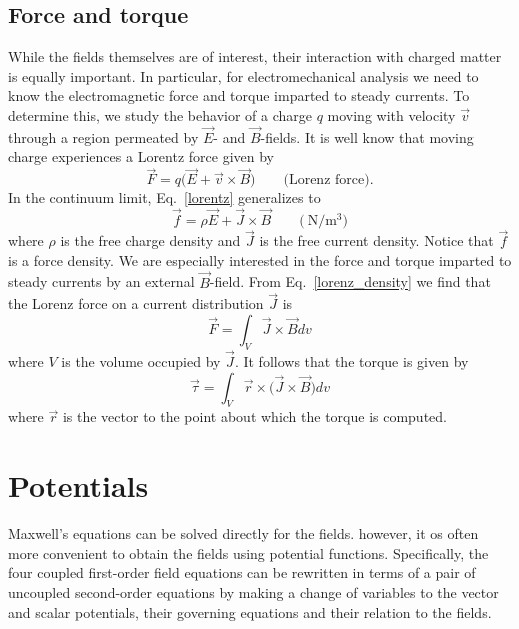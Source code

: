 \documentclass[12pt,a4paper,oneside]{book}
\begin{document}
\begin{onehalfspace}
\subsection{Force and torque}
While the fields themselves are of interest, their interaction with charged matter is equally important. In particular, for electromechanical analysis we need to know the electromagnetic force and torque imparted to steady currents. To determine this, we study the behavior of a charge $q$ moving with velocity $\vec{v}$ through a region permeated by $\vec{E}$- and $\vec{B}$-fields. It is well know that moving charge experiences a Lorentz force given by 
\begin{equation}\label{lorenz}
	\vec{F} = q\big(\vec{E}+\vec{v}\times\vec{B}\big) \qquad\text{(Lorenz force).}
\end{equation}
In the continuum limit, Eq.~\eqref{lorentz} generalizes to 
\begin{equation}\label{lorenz_density}
	\vec{f} = \rho\vec{E}+\vec{J}\times\vec{B} \qquad\big(\SI{}{\newton\per\cubic\meter}\big)
\end{equation}
where $\rho$ is the free charge density and $\vec{J}$ is the free current density. Notice that $\vec{f}$ is a force density.
We are especially interested in the force and torque imparted to steady currents by an external $\vec{B}$-field. From Eq.~\eqref{lorenz_density} we find that the Lorenz force on a current distribution $\vec{J}$ is
\begin{equation}\label{lorenz_volume}
	\vec{F} = \int_{V}\vec{J}\times\vec{B}dv
\end{equation}
where $V$ is the volume occupied by $\vec{J}$. It follows that the torque is given by
\begin{equation}\label{torque_volume}
	\vec{\tau} = \int_{V}\vec{r}\times\big(\vec{J}\times\vec{B}\big)dv
\end{equation}
where $\vec{r}$ is the vector to the point about which the torque is computed.

\section{Potentials}
Maxwell's equations can be solved directly for the fields. however, it os often more convenient to obtain the fields using potential functions. Specifically, the four coupled first-order field equations can be rewritten in terms of a pair of uncoupled second-order equations by making a change of variables to the vector and scalar potentials, their governing equations and their relation to the fields.


\end{onehalfspace}
\end{document}

